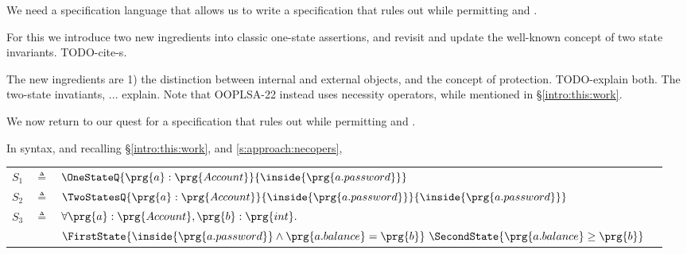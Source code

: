 We need  a specification language that allows us to write a specification that rules out \ModB while permitting \ModA and
\ModC.  

For this we introduce two new ingredients into classic one-state assertions, and revisit and update the well-known concept of two state invariants. TODO-cite-s.\

The new ingredients are 1) the distinction between internal and external objects, and the concept of protection. TODO-explain both.
The two-state invatiants, ... explain.
Note that OOPLSA-22 instead uses    necessity operators, while mentioned in  \S \ref{intro:this:work}. 

 


\label{s:bankSpecEx}

We now {return to our quest for} a specification that rules out \ModB while permitting \ModA and
\ModC. 


In \Nec  syntax, and {recalling \S \ref{intro:this:work}, and \ref{s:approach:necopers},}
 
 \begin{tabular}{lcll}
$S_1$   &     $\triangleq$   & $\OneStateQ{\prg{a}:\prg{Account} } {\inside{\prg{a.password}}} $
 \\
 $S_2$   & $\triangleq$   &  $\TwoStatesQ {\prg{a}:\prg{Account}}  {\inside{\prg{a.password}}} {\inside{\prg{a.password}}}$
 \\
$S_3$ & $\triangleq$   &
  $\forall \prg{a}:\prg{Account},\prg{b}:\prg{int}.$\\
  &  &  $\FirstState{\inside{\prg{a.password}} \wedge \prg{a.balance}=\prg{b}} 
\  \SecondState{ \prg{a.balance}\geq \prg{b} }$
 \end{tabular}



